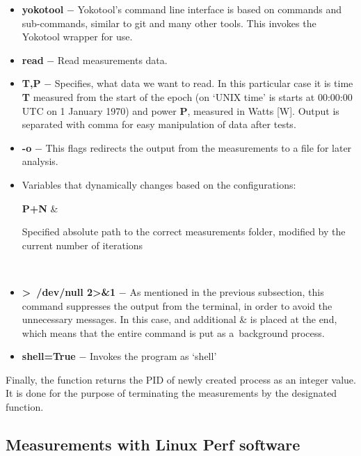\begin{itemize}
    \item \textbf{yokotool} $-$ Yokotool's command line interface is based
    on commands and sub-commands, similar to git and many other tools. This
    invokes the Yokotool wrapper for use.
    \item \textbf{read} $-$ Read measurements data.
    \item \textbf{T,P} $-$ Specifies, what data we want to read. In this
    particular case it is time \textbf{T} measured from the start of the epoch
    (on `UNIX time' is starts at 00:00:00 UTC on 1 January 1970) and power
    \textbf{P}, measured in Watts [W]. Output is separated with comma for
    easy manipulation of data after tests.
    \item \textbf{-o} $-$ This flags redirects the output from the
    measurements to a file for later analysis.
    \item Variables that dynamically changes based on the configurations:
    \begin{conditions}
        \textbf{P+N} & \parbox[t]{12cm}{Specified absolute path to
        the correct measurements folder, modified by the current number of
        iterations} \\
    \end{conditions}
    \item \textbf{\textgreater~/dev/null 2\textgreater\&1} $-$
    As mentioned in the previous subsection, this command suppresses the
    output from the terminal, in order to avoid the unnecessary messages.
    In this case, and additional \& is placed at the end, which means that
    the entire command is put as a~background process.
    \item \textbf{shell=True} $-$ Invokes the program as `shell'
\end{itemize}

Finally, the function returns the PID of newly created process
as an integer value. It is done for the purpose of terminating the
measurements by the designated function.

\newpage

\subsection{Measurements with Linux Perf software}

